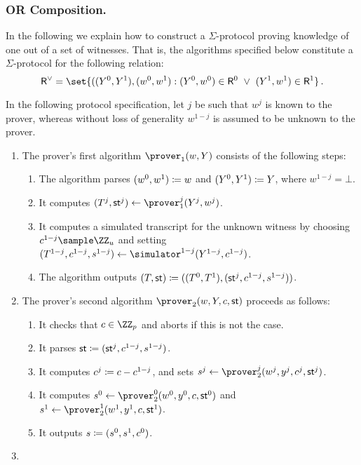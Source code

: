 \documentclass[runningheads]{llncs}
\begin{document}
\subsubsection{OR Composition.}
  In the following we explain how to construct a $\Sigma$-protocol proving knowledge of one out of a set of witnesses.
  That is, the algorithms specified below constitute a $\Sigma$-protocol for the following relation:
\[
  \relation^\lor = \set{
    ((Y^0,Y^1),(w^0,w^1) :
    (Y^0,w^0)\in \relation^0 ~\lor~ (Y^1,w^1)\in\relation^1}\,.
\]

  In the following protocol specification, let $j$ be such that $w^j$ is known to the prover, whereas without loss of generality $w^{1-j}$ is assumed to be unknown to the prover.
\begin{enumerate}
  \item
    The prover's first algorithm $\prover_1(w,Y)$ consists of the following steps:
    \begin{enumerate}
      \item
        The algorithm parses $(w^0,w^1)\coloneqq w$ and $(Y^0,Y^1)\coloneqq Y$, where $w^{1-j}=\bot$.
      \item
        It computes $(T^j,\st^j)\gets\prover_1^j(Y^j,w^j)$.
      \item
        It computes a simulated transcript for the unknown witness by choosing $c^{1-j}\sample\ZZ_u$ and setting $(T^{1-j},c^{1-j},s^{1-j})\gets\simulator^{1-j}(Y^{1-j},c^{1-j})$.
      \item
	The algorithm outputs $(T,\mathsf{st}) \coloneqq ((T^0,T^1),(\mathsf{st}^j,c^{1-j},s^{1-j}))$.
    \end{enumerate}
  \item
    The prover's second algorithm $\prover_2(w,Y,c,\st)$ proceeds as follows:
    \begin{enumerate}
      \item
        It checks that $c\in\ZZ_p$ and aborts if this is not the case.
      \item
	It parses $\mathsf{st}\coloneqq(\mathsf{st}^j,c^{1-j},s^{1-j})$.
      \item
        It computes $c^j\coloneqq c-c^{1-j}$, and sets $s^j\gets\prover_2^j(w^j,y^j,c^j,\st^j)$.
      \item
        It computes $s^0\gets\prover_2^0(w^0,y^0,c,\st^0)$ and $s^1\gets\prover_2^1(w^1,y^1,c,\st^1)$.
      \item
        It outputs $s\coloneqq(s^0,s^1,c^0)$.
    \end{enumerate}
  \item

\end{enumerate}
\end{document}
